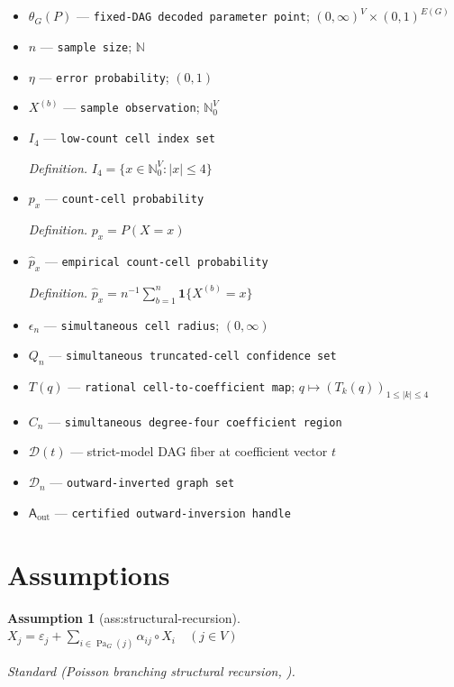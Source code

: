 \documentclass{article}
\newtheorem{assumption}{Assumption}
\begin{document}
\begin{itemize}
  \item \(\theta_G(P)\) --- \texttt{fixed-\allowbreak{}DAG decoded parameter point}; \((0,\infty)^V\times(0,1)^{E(G)}\)
  \item \(n\) --- \texttt{sample size}; \(\mathbb N\)
  \item \(\eta\) --- \texttt{error probability}; \((0,1)\)
  \item \(X^{(b)}\) --- \texttt{sample observation}; \(\mathbb N_0^V\)
  \item \(I_4\) --- \texttt{low-\allowbreak{}count cell index set}
  \par\smallskip\noindent\emph{Definition.} \(I_4=\{x\in\mathbb N_0^V:|x|\le4\}\)
  \item \(p_x\) --- \texttt{count-\allowbreak{}cell probability}
  \par\smallskip\noindent\emph{Definition.} \(p_x=P(X=x)\)
  \item \(\widehat p_x\) --- \texttt{empirical count-\allowbreak{}cell probability}
  \par\smallskip\noindent\emph{Definition.} \(\widehat p_x=n^{-1}\sum_{b=1}^n\mathbf1\{X^{(b)}=x\}\)
  \item \(\epsilon_n\) --- \texttt{simultaneous cell radius}; \((0,\infty)\)
  \item \(Q_n\) --- \texttt{simultaneous truncated-\allowbreak{}cell confidence set}
  \item \(T(q)\) --- \texttt{rational cell-\allowbreak{}to-\allowbreak{}coefficient map}; \(q\mapsto(T_k(q))_{1\le|k|\le4}\)
  \item \(C_n\) --- \texttt{simultaneous degree-\allowbreak{}four coefficient region}
  \item \(\mathcal D(t)\) --- strict-model DAG fiber at coefficient vector \(t\)
  \item \(\mathcal D_n\) --- \texttt{outward-\allowbreak{}inverted graph set}
  \item \(\mathsf A_{\mathrm{out}}\) --- \texttt{certified outward-\allowbreak{}inversion handle}
\end{itemize}

\section{Assumptions}

\begin{assumption}[ass:structural-recursion]\label{ass:structural-recursion}
\(X_j=\varepsilon_j+\sum_{i\in\operatorname{Pa}_G(j)}\alpha_{ij}\circ X_i\quad(j\in V)\)
\par\smallskip\noindent\emph{Standard} (Poisson branching structural recursion, \cite{qiao2024causal}).
\end{assumption}
\end{document}
